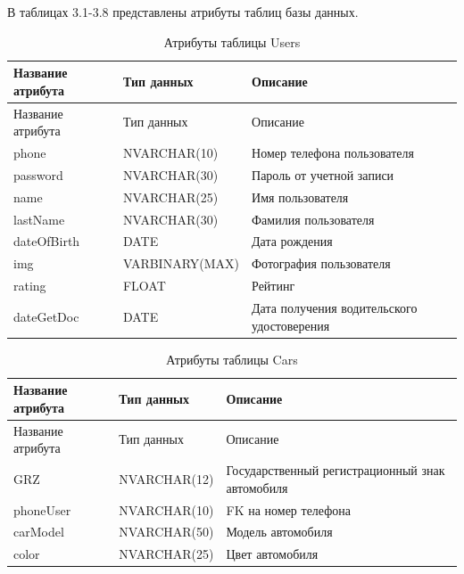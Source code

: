 В таблицах 3.1-3.8 представлены атрибуты таблиц базы данных.

\begin{xltabular}{\textwidth}{|X|X|X|}
	\caption{Атрибуты таблицы Users\label{ssevsws:table}}\\ \hline
	\centrow Название атрибута & \centrow Тип данных & \centrow Описание \\ \hline
	\endfirsthead
	\centrow Название атрибута & \centrow Тип данных & \centrow Описание \\ \hline 
	\finishhead
	phone & NVARCHAR(10) & Номер телефона пользователя\\ \hline 
	password & NVARCHAR(30) & Пароль от учетной записи \\ \hline 
	name & NVARCHAR(25) & Имя пользователя \\ \hline 
	lastName & NVARCHAR(30) & Фамилия пользователя \\ \hline
	dateOfBirth & DATE & Дата рождения \\ \hline
	img & VARBINARY(MAX) & Фотография пользователя \\ \hline 
	rating & FLOAT & Рейтинг \\ \hline 
	dateGetDoc & DATE & Дата получения водительского удостоверения \\ \hline 
\end{xltabular}

\begin{xltabular}{\textwidth}{|X|X|X|}
	\caption{Атрибуты таблицы Cars\label{ssevsws:table}}\\ \hline
	\centrow Название атрибута & \centrow Тип данных & \centrow Описание \\ \hline
	\endfirsthead
	\centrow Название атрибута & \centrow Тип данных & \centrow Описание \\ \hline 
	\finishhead
	GRZ & NVARCHAR(12) & Государственный регистрационный знак автомобиля \\ \hline 
	phoneUser & NVARCHAR(10) & FK на номер телефона \\ \hline 
	carModel & NVARCHAR(50) & Модель автомобиля \\ \hline 
	color & NVARCHAR(25) & Цвет автомобиля \\ \hline 
\end{xltabular}

